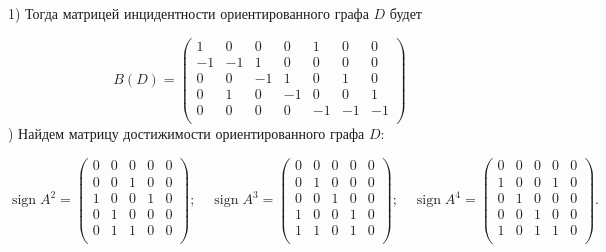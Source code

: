 \documentclass[fleqn]{article}
\DeclareMathOperator{\sign}{sign}
\begin{document}
1) Тогда матрицей инцидентности ориентированного графа $D$ будет

$$B(D)=
\begin{pmatrix}
1 & 0 & 0 & 0 & 1 & 0 & 0 \\
-1 & -1 & 1 & 0 & 0 & 0 & 0 \\
0 & 0 & -1 & 1 & 0 & 1 & 0 \\
0 & 1 & 0 & -1 & 0 & 0 & 1 \\
0 & 0 & 0 & 0 & -1 & -1 & -1 \\
\end{pmatrix}
$$
) Найдем матрицу достижимости ориентированного графа $D$:

$$
\sign{A^2} = \begin{pmatrix}
0 & 0 & 0 & 0 & 0 \\
0 & 0 & 1 & 0 & 0 \\
1 & 0 & 0 & 1 & 0 \\
0 & 1 & 0 & 0 & 0 \\
0 & 1 & 1 & 0 & 0 \\
\end{pmatrix}
;\quad
\sign{A^3} = \begin{pmatrix}
0 & 0 & 0 & 0 & 0 \\
0 & 1 & 0 & 0 & 0 \\
0 & 0 & 1 & 0 & 0 \\
1 & 0 & 0 & 1 & 0 \\
1 & 1 & 0 & 1 & 0 \\
\end{pmatrix}
;\quad
\sign{A^4} = \begin{pmatrix}
0 & 0 & 0 & 0 & 0 \\
1 & 0 & 0 & 1 & 0 \\
0 & 1 & 0 & 0 & 0 \\
0 & 0 & 1 & 0 & 0 \\
1 & 0 & 1 & 1 & 0 \\
\end{pmatrix}.
$$
\end{document}
